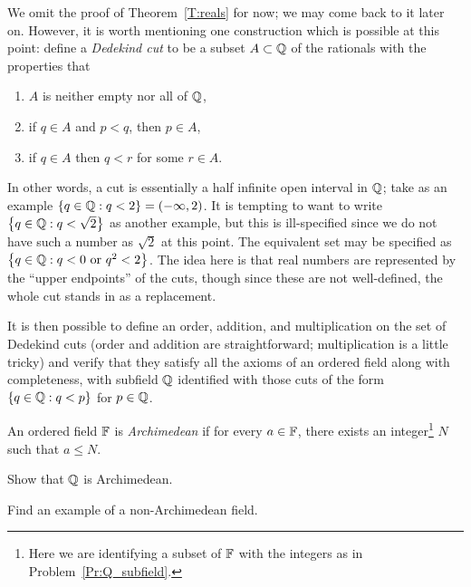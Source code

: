 \documentclass{book}
\begin{document}
\begin{rmk}
We omit the proof of Theorem~\ref{T:reals} for now; we may come back to it
later on. However, it is worth mentioning one construction which is possible at
this point: define a {\em Dedekind cut} to be a subset $A \subset \mathbb{Q}$ of the rationals
with the properties that 
\begin{enumerate}
\item $A$ is neither empty nor all of $\mathbb{Q}$,
\item if $q \in A$ and $p < q$, then $p \in A$,
\item if $q \in A$ then $q < r$ for some $r \in A$.
\end{enumerate}
In other words, a cut is essentially a half infinite open interval in $\mathbb{Q}$;
take as an example $\left\{ q \in \mathbb{Q} : q < 2 \right\} = (-\infty, 2)$. It is 
tempting to want to write $\left\{ q \in \mathbb{Q} : q < \sqrt 2 \right\}$ as another example, but this
is ill-specified since we do not have such a number as $\sqrt 2$ at this point.
The equivalent set may be specified as $\left\{ q \in \mathbb{Q} : q < 0 \text{ or }
q^2 < 2 \right\}$. The idea here is that real numbers are represented by the ``upper endpoints'' of the cuts,
though since these are not well-defined, the whole cut stands in as a replacement.

It is then possible to define an order, addition, and multiplication on the set
of Dedekind cuts (order and addition are straightforward; multiplication is a
little tricky) and verify that they satisfy all the axioms of an ordered field
along with completeness, with subfield $\mathbb{Q}$ identified with those cuts of the
form $\left\{ q \in \mathbb{Q} : q < p \right\}$ for $p \in \mathbb{Q}$.
\end{rmk}

\begin{defn}
An ordered field $\mathbb{F}$ is {\em Archimedean} if for every $a \in \mathbb{F}$, there exists
an integer\footnote{Here we are identifying a subset of $\mathbb{F}$ with the integers
as in Problem~\ref{Pr:Q_subfield}.} $N$ such that $a \leq N$.
\label{D:archimedean}
\end{defn}

\begin{exstar}
Show that $\mathbb{Q}$ is Archimedean.
\label{Ex:Q_Archimedean}
\end{exstar}

\begin{ex}
Find an example of a non-Archimedean field.
\label{Ex:non_Archimedean_field}
\end{ex}
\end{document}
